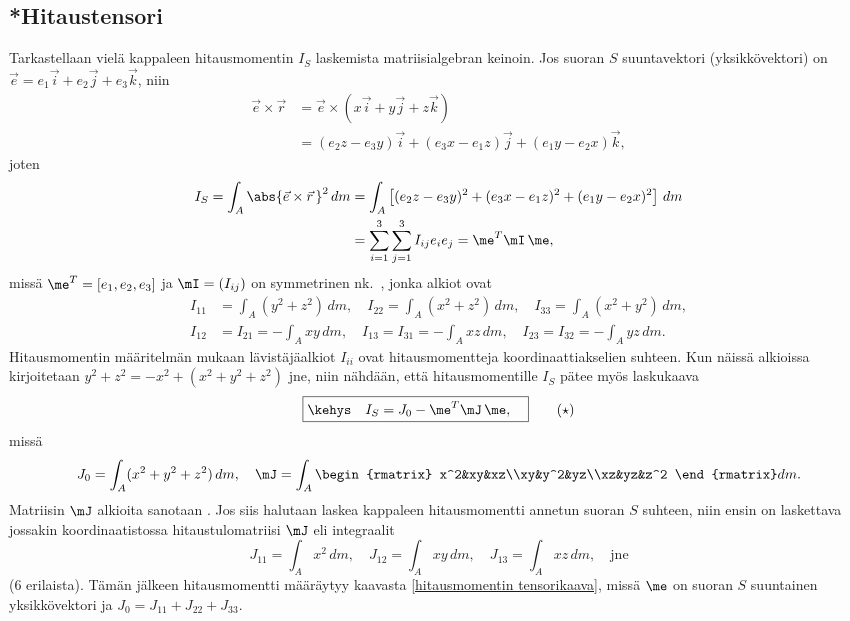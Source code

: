 \subsection{*Hitaustensori}

Tarkastellaan vielä kappaleen hitausmomentin $I_S$ laskemista matriisialgebran keinoin. Jos
suoran $S$ suuntavektori (yksikkövektori) on $\vec e = e_1\vec i + e_2\vec j + e_3\vec k$, niin
\begin{align*}
\vec e\times\vec r &= \vec e \times(x\vec i + y\vec j + z\vec k) \\
                   &= (e_2 z - e_3 y)\vec i + (e_3 x - e_1 z)\vec j + (e_1 y - e_2 x)\vec k,
\end{align*}
joten
\begin{align*}
I_S = \int_A \abs{\vec e\times\vec r\,}^2\,dm 
   &= \int_A\left[(e_2 z - e_3 y)^2 + (e_3 x - e_1 z)^2 + (e_1 y - e_2 x)^2\right]\,dm \\
   &= \sum_{i=1}^3\sum_{j=1}^3 I_{ij}e_ie_j = \me^T\mI\,\me,
\end{align*}
missä $\me^T = [e_1,e_2,e_3]$ ja $\mI = (I_{ij})$ on symmetrinen nk.\ ,
jonka alkiot ovat
\begin{align*}
I_{11}&=\int_A (y^2+z^2)\,dm, \quad I_{22}=\int_A (x^2+z^2)\,dm, \quad 
                                    I_{33}=\int_A (x^2+y^2)\,dm, \\
I_{12}&=I_{21}=-\int_A xy\,dm, \quad I_{13}=I_{31}=-\int_A xz\,dm, \quad 
                                     I_{23}=I_{32}=-\int_A yz\,dm.
\end{align*}
Hitausmomentin määritelmän mukaan lävistäjäalkiot $I_{ii}$ ovat hitausmomentteja 
koordinaattiakselien suhteen. Kun näissä alkioissa kirjoitetaan 
$y^2+z^2=-x^2+(x^2+y^2+z^2)$ jne, niin nähdään, että hitausmomentille $I_S$ pätee myös
laskukaava
\begin{equation} \label{hitausmomentin tensorikaava}
\boxed{\kehys\quad I_S = J_0 - \me^T\mJ\,\me, \quad } \tag{$\star$}
\end{equation}
missä
\[ 
J_0 = \int_A (x^2+y^2+z^2)\,dm,\quad \mJ 
    = \int_A \begin{rmatrix} x^2&xy&xz\\xy&y^2&yz\\xz&yz&z^2 \end{rmatrix} dm. 
\]
Matriisin $\mJ$ alkioita sanotaan . Jos siis halutaan laskea kappaleen
hitausmomentti annetun suoran $S$ suhteen, niin ensin on laskettava jossakin koordinaatistossa
hitaustulomatriisi $\mJ$ eli integraalit 
\[ 
J_{11} = \int_A x^2\, dm, \quad J_{12} = \int_A xy\,dm, \quad 
                                J_{13}=\int_A xz\,dm, \quad \text{jne} 
\]
($6$ erilaista). Tämän jälkeen hitausmomentti määräytyy kaavasta
\eqref{hitausmomentin tensorikaava}, missä $\me$ on suoran $S$ suuntainen yksikkövektori
ja $J_0 = J_{11}+J_{22}+J_{33}$.

